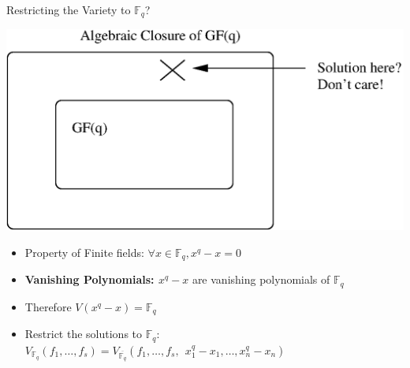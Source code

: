 \documentclass[xcolor=dvipsnames]{beamer}
\begin{document}
\begin{frame}{\large {Restricting the Variety to $\mathbb{F}_q$?}}

\begin{center}
    \includegraphics[scale=0.45]{gfq-closure.eps}
\end{center}

 \begin{itemize}
 \item Property of Finite fields: $\forall x\in \mathbb{F}_q, x^q-x=0$
 \item {\bf Vanishing Polynomials: $x^q - x$} are vanishing polynomials
   of $\mathbb{F}_q$
 \item Therefore $V(x^q - x) = \mathbb{F}_q$
 \item Restrict the solutions to $\mathbb{F}_q$: $V_{\mathbb{F}_q}(f_1, \dots, f_s) =
   V_{\overline{\mathbb{F}_q}}(f_1, \dots, f_s, ~~x_1^q - x_1, \dots,  x_n^q - x_n)$
 \end{itemize}


\end{frame}
\end{document}
